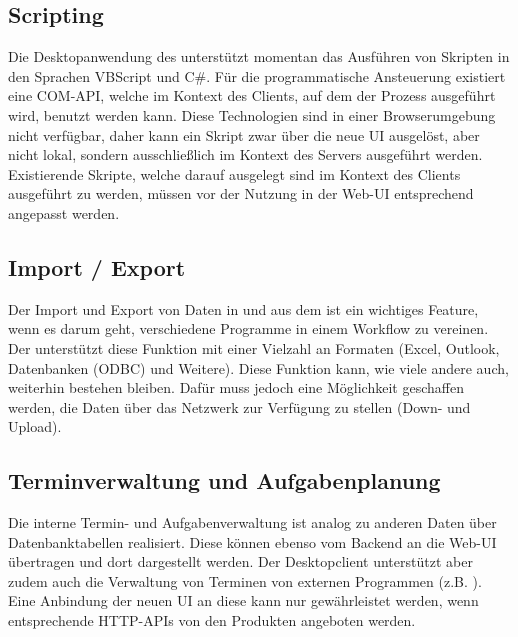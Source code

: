 \subsection{Scripting}
Die Desktopanwendung des  unterstützt momentan das Ausführen von Skripten in den Sprachen VBScript und C\#. Für die programmatische Ansteuerung existiert eine \gls{COM}-API, welche im Kontext des Clients, auf dem der Prozess ausgeführt wird, benutzt werden kann. Diese Technologien sind in einer Browserumgebung nicht verfügbar, daher kann ein Skript zwar über die neue UI ausgelöst, aber nicht lokal, sondern ausschließlich im Kontext des Servers ausgeführt werden. Existierende Skripte, welche darauf ausgelegt sind im Kontext des Clients ausgeführt zu werden, müssen vor der Nutzung in der Web-UI entsprechend angepasst werden.

\subsection{Import / Export}
Der Import und Export von Daten in und aus dem  ist ein wichtiges Feature, wenn es darum geht, verschiedene Programme in einem Workflow zu vereinen. Der  unterstützt diese Funktion mit einer Vielzahl an Formaten (Excel, Outlook, Datenbanken (ODBC) und Weitere). Diese Funktion kann, wie viele andere auch, weiterhin bestehen bleiben. Dafür muss jedoch eine Möglichkeit geschaffen werden, die Daten über das Netzwerk zur Verfügung zu stellen (Down- und Upload).

\subsection{Terminverwaltung und Aufgabenplanung}
Die interne Termin- und Aufgabenverwaltung ist analog zu anderen Daten über Datenbanktabellen realisiert. Diese können ebenso vom Backend an die Web-UI übertragen und dort dargestellt werden. Der Desktopclient unterstützt aber zudem auch die Verwaltung von Terminen von externen Programmen (z.B. ). Eine Anbindung der neuen UI an diese kann nur gewährleistet werden, wenn entsprechende HTTP-APIs von den Produkten angeboten werden.

